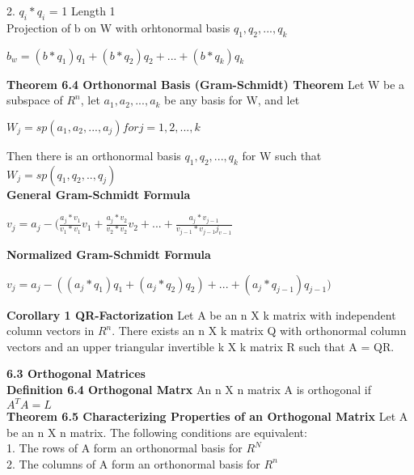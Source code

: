 \documentclass{article}
\begin{document}
2. $q_i * q_i$ = 1                         Length 1
\\

Projection of b on W with orhtonormal basis {$q_1, q_2,..., q_k$}
\begin{center}
$ b_w = (b * q_1)q_1 + (b * q_2)q_2 + ... + (b * q_k)q_k$
\end{center}

\textbf {Theorem 6.4 Orthonormal Basis (Gram-Schmidt) Theorem} Let W be a subspace of $R^n$, let {$a_1, a_2,...,a_k$} be any basis for W, and let
\begin{center}
$W_j = sp(a_1,a_2,...,a_j) for j = 1,2,...,k$
\end{center}
Then there is an orthonormal basis {$q_1, q_2,...,q_k$} for W such that $W_j = sp(q_1,q_2,..,q_j)$
 \\

\textbf {General Gram-Schmidt Formula} 
\begin{center}
$v_j = a_j - ({\frac{a_j * v_1}{v_1 * v_1}v_1} + {\frac {a_j * v_2}{v_2 * v_2}v_2} + ... + {\frac{a_j * v_{j-1}} {v_{j-1} * v_{j-1} j_{v-1}}}$
\\
\end{center}

\textbf {Normalized Gram-Schmidt Formula}
\begin{center}
$v_j=a_j - ((a_j * q_1)q_1 + (a_j * q_2)q_2) + ... + (a_j * q_{j-1})q_{j-1}) $
\end{center}

\textbf {Corollary 1 QR-Factorization} Let A be an n X k matrix with independent column vectors in $R^n$. There exists an n X k matrix Q with orthonormal column vectors and an upper triangular invertible k X k matrix R such that A = QR.

\textbf {6.3 Orthogonal Matrices} \\

\textbf {Definition 6.4 Orthogonal Matrx} An n X n matrix A is orthogonal if $A^TA = L$
\\

\textbf {Theorem 6.5 Characterizing Properties of an Orthogonal Matrix} Let A be an n X n matrix. The following conditions are equivalent: \\

1. The rows of A form an orthonormal basis for $R^N$ \\

2. The columns of A form an orthonormal basis for $R^n$ \\ 
\end{document}
